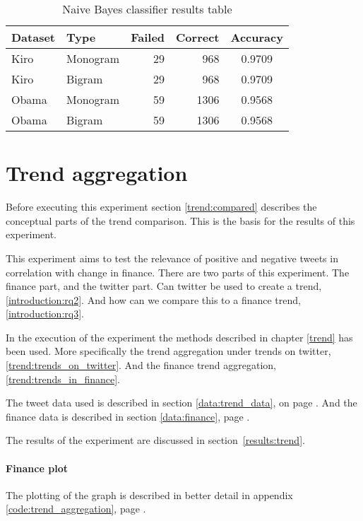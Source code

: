 \begin{table}
\centering
\label{tbl:naive_bayes_classification_results}
\caption{Naive Bayes classifier results table}
\begin{tabular}{ l l r r c }
Dataset & Type & Failed & Correct & Accuracy \\ 
\hline 
Kiro & Monogram & 29 & 968 & 0.9709 \\
Kiro & Bigram & 29 & 968 & 0.9709 \\
Obama & Monogram & 59 & 1306 & 0.9568 \\
Obama & Bigram & 59 & 1306 & 0.9568 \\
\end{tabular}
\end{table}
%

\section{Trend aggregation}\label{experiments:trend}
Before executing this experiment section \ref{trend:compared} describes the
conceptual parts of the trend comparison. This is the basis for the results of
this experiment. 

This experiment aims to test the relevance of positive and negative tweets in
correlation with change in finance. There are two parts of this experiment. The
finance part, and the twitter part. Can twitter be used to create a trend,
\ref{introduction:rq2}. And how can we compare this to a finance trend,
\ref{introduction:rq3}.

In the execution of the experiment the methods described in chapter \ref{trend}
has been used. More specifically the trend aggregation under trends on twitter,
\ref{trend:trends_on_twitter}. And the finance trend aggregation,
\ref{trend:trends_in_finance}.

The tweet data used is described in section \ref{data:trend_data}, on page
\pageref{data:trend_data}. And the finance data is described in section
\ref{data:finance}, page \pageref{data:finance}.

The results of the experiment are discussed in section \ref{results:trend}.

\paragraph{Finance plot}
The plotting of the graph is described in better detail in appendix
\ref{code:trend_aggregation}, page \pageref{code:trend_aggregation}.

